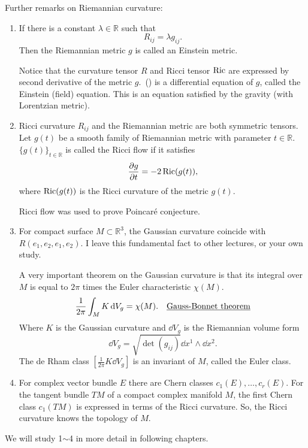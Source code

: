 Further remarks on Riemannian curvature:
\begin{enumerate}[1.]
\item If there is a constant  \(\lambda\in \mathbb{R}\) such that
  \begin{equation*}
    R_{ij}=\lambda g_{ij} \tag{\ast}
  .\end{equation*}
  Then the Riemannian metric \(g\) is called an Einstein metric.

  Notice that the curvature tensor \(R\) and Ricci tensor \(\operatorname{Ric}\) are expressed by
  second derivative of the metric \(g\).\ (\ast) is a differential equation of \(g\),
  called the Einstein (field) equation. This is an equation satisfied by the
    gravity (with Lorentzian metric).
\item Ricci curvature \(R_{ij}\) and the Riemannian metric are both symmetric tensors.
  Let \(g(t)\) be a smooth family of Riemannian metric with parameter \(t\in
  \mathbb{R}\). \(\{g(t)\}_{t\in \mathbb{R}}\) is called the Ricci flow if it
  satisfies \[
    \pdv{g}{t}=-2\operatorname{Ric}(g(t))
  ,\] where \(\operatorname{Ric}(g(t))\) is the Ricci curvature of the metric \(g(t)\).

  Ricci flow was used to prove Poincaré conjecture.
\item For compact surface \(M\subset \mathbb{R}^3\), the Gaussian curvature coincide
  with \(R(e_1,e_2,e_1,e_2)\). I leave this fundamental fact to other lectures, or
  your own study.

  A very important theorem on the Gaussian curvature is that its integral over \(M\)
  is equal to \(2\pi\) times the Euler characteristic \(\chi(M)\). \[
    \frac{1}{2\pi}\int_{M}K\dd{V_g}=\chi(M).
    \quad\text{\underline{Gauss-Bonnet theorem}}
  \] Where \(K\) is the Gaussian curvature and \(\dd{V_g}\) is the Riemannian volume
  form \[
    \dd{V_g}=\sqrt{\det(g_{ij})}\dd{x^1}\wedge \dd{x^2}
  .\] The de Rham class \(\left[\frac{1}{2\pi}K\dd{V_g}\right]\) is an invariant
  of \(M\), called the Euler class.
\item For complex vector bundle \(E\) there are Chern classes \(c_1(E),\ldots,
  c_r(E)\). For the tangent bundle \(TM\) of a compact complex manifold \(M\), the 
  first Chern class \(c_1(TM)\) is expressed in terms of the Ricci curvature.
  So, the Ricci curvature knows the topology of \(M\).
\end{enumerate}
We will study 1\(\sim\)4 in more detail in following chapters.
